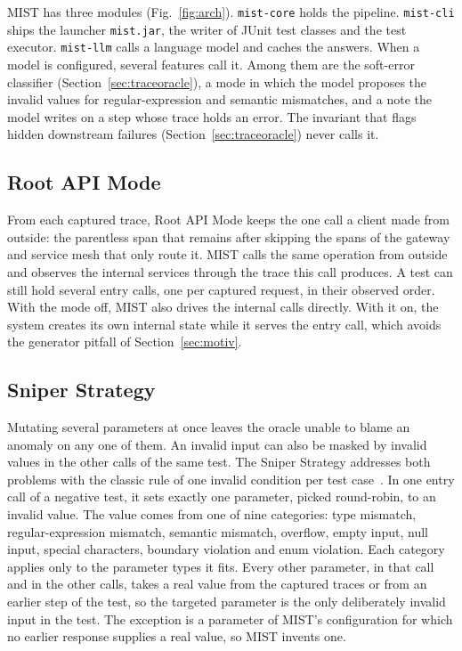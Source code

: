 \documentclass[10pt,conference]{IEEEtran}
\begin{document}
MIST has three modules (Fig.~\ref{fig:arch}). \texttt{mist-core} holds the pipeline. \texttt{mist-cli} ships the launcher \texttt{mist.jar}, the writer of JUnit test classes and the test executor. \texttt{mist-llm} calls a language model and caches the answers. When a model is configured, several features call it. Among them are the soft-error classifier (Section~\ref{sec:traceoracle}), a mode in which the model proposes the invalid values for regular-expression and semantic mismatches, and a note the model writes on a step whose trace holds an error. The invariant that flags hidden downstream failures (Section~\ref{sec:traceoracle}) never calls it.

\subsection{Root API Mode}\label{sec:rootmode}

From each captured trace, Root API Mode keeps the one call a client made from outside: the parentless span that remains after skipping the spans of the gateway and service mesh that only route it. MIST calls the same operation from outside and observes the internal services through the trace this call produces. A test can still hold several entry calls, one per captured request, in their observed order. With the mode off, MIST also drives the internal calls directly. With it on, the system creates its own internal state while it serves the entry call, which avoids the generator pitfall of Section~\ref{sec:motiv}.
\subsection{Sniper Strategy}\label{sec:sniper}

Mutating several parameters at once leaves the oracle unable to blame an anomaly on any one of them. An invalid input can also be masked by invalid values in the other calls of the same test. The Sniper Strategy addresses both problems with the classic rule of one invalid condition per test case~\cite{Myers1979ArtOfSoftwareTesting}. In one entry call of a negative test, it sets exactly one parameter, picked round-robin, to an invalid value. The value comes from one of nine categories: type mismatch, regular-expression mismatch, semantic mismatch, overflow, empty input, null input, special characters, boundary violation and enum violation. Each category applies only to the parameter types it fits. Every other parameter, in that call and in the other calls, takes a real value from the captured traces or from an earlier step of the test, so the targeted parameter is the only deliberately invalid input in the test. The exception is a parameter of MIST's configuration for which no earlier response supplies a real value, so MIST invents one.
\end{document}
